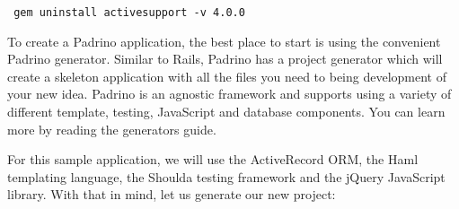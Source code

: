 \begin{verbatim}
 gem uninstall activesupport -v 4.0.0
\end{verbatim}

To create a Padrino application, the best place to start is using
the convenient Padrino generator. Similar to Rails, Padrino has a
project generator which will create a skeleton application with all
the files you need to being development of your new idea. Padrino
is an agnostic framework and supports using a variety of different
template, testing, JavaScript and database components. You can learn
more by reading the generators guide.

For this sample application, we will use the ActiveRecord ORM, the
Haml templating language, the Shoulda testing framework and the
jQuery JavaScript library. With that in mind, let us generate our
new project:

